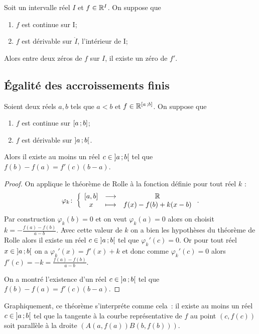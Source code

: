 \begin{corth}
  Soit un intervalle réel \(I\) et \(f \in \mathbb{R}^I\). On suppose que
  \begin{enumerate}
  \item \(f\) est continue sur I;
  \item \(f\) est dérivable sur \(\mathring{I}\), l'intérieur de I;
  \end{enumerate}
  Alors entre deux zéros de \(f\) sur \(I\), il existe un zéro de \(f'\).
\end{corth}

\subsection{Égalité des accroissements finis}

\begin{theo}
  Soient deux réels \(a,b\) tels que \(a < b\) et \(f \in \mathbb{R}^{\left[ a \, ;  b \right]}\). On suppose que
  \begin{enumerate}
  \item \(f\) est continue sur \(\left[ a \, ;  b \right]\);
  \item \(f\) est dérivable sur \(\left] a \, ;  b \right[\).
  \end{enumerate}
  Alors il existe au moins un réel \(c \in \left] a \, ;  b \right[\) tel que \(f(b)-f(a)=f'(c)(b-a)\). 
\end{theo}
\begin{proof}
  On applique le théorème de Rolle à la fonction définie pour tout réel \(k\) :
  \begin{equation}
    \varphi_k\colon \left\{\begin{array}{ccc} [a,b] & \longrightarrow &\mathbb{R}\\ x & \longmapsto & f(x)-f(b)+k(x-b) \end{array} \right..
  \end{equation}
  Par construction \(\varphi_k(b)=0\) et on veut \(\varphi_k(a)=0\) alors on choisit \(k = -\frac{f(a)-f(b)}{a-b}\). Avec cette valeur de \(k\) on a bien les hypothèses du théorème de Rolle alors il existe un réel \(c \in \left] a \, ;  b \right[\) tel que \(\varphi_k'(c)=0\). Or pour tout réel \(x \in \left] a \, ;  b \right[\) on a \(\varphi_k'(x)=f'(x)+k\) et donc comme \(\varphi_k'(c)=0\) alors \(f'(c)=-k=\frac{f(a)-f(b)}{a-b}\).

On a montré l'existence d'un réel \(c \in \left] a \, ;  b \right[\) tel que \(f(b)-f(a)=f'(c)(b-a)\).
\end{proof}

Graphiquement, ce théorème s'interpréte comme cela~: il existe au moins un réel \(c \in \left] a \, ;  b \right[\) tel que la tangente à la courbe représentative de \(f\) au point \((c,f(c))\) soit parallèle à la droite \((A(a,f(a))B(b,f(b)))\).


